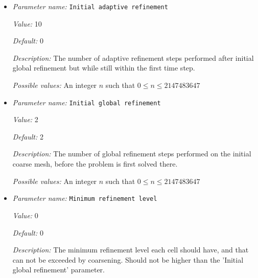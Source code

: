 \begin{itemize}
{\it Value:} 0.0


{\it Default:} 0.05


{\it Description:} The fraction of cells with the smallest error that should be flagged for coarsening.


{\it Possible values:} A floating point number $v$ such that $0 \leq v \leq 1$
\item {\it Parameter name:} {\tt Initial adaptive refinement}
\label{parameters:Mesh refinement/Initial adaptive refinement}
\label{parameters:Mesh_20refinement/Initial_20adaptive_20refinement}


{\it Value:} 10


{\it Default:} 0


{\it Description:} The number of adaptive refinement steps performed after initial global refinement but while still within the first time step.


{\it Possible values:} An integer $n$ such that $0\leq n \leq 2147483647$
\item {\it Parameter name:} {\tt Initial global refinement}
\label{parameters:Mesh refinement/Initial global refinement}
\label{parameters:Mesh_20refinement/Initial_20global_20refinement}


{\it Value:} 2


{\it Default:} 2


{\it Description:} The number of global refinement steps performed on the initial coarse mesh, before the problem is first solved there.


{\it Possible values:} An integer $n$ such that $0\leq n \leq 2147483647$
\item {\it Parameter name:} {\tt Minimum refinement level}
\label{parameters:Mesh refinement/Minimum refinement level}
\label{parameters:Mesh_20refinement/Minimum_20refinement_20level}


{\it Value:} 0


{\it Default:} 0


{\it Description:} The minimum refinement level each cell should have, and that can not be exceeded by coarsening. Should not be higher than the 'Initial global refinement' parameter.



\end{itemize}

